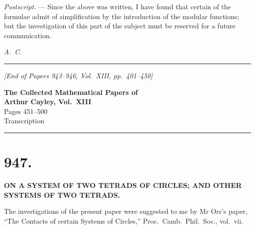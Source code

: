 \documentclass[11pt,a4paper]{book}
\begin{document}
\medskip

\noindent\textit{Postscript.} --- Since the above was written, I have found that certain of the formulae admit of simplification by the introduction of the modular functions; but the investigation of this part of the subject must be reserved for a future communication.

\vspace{1cm}
\begin{flushright}
\textit{A.~C.}
\end{flushright}

\vfill
\begin{center}
\rule{0.5\textwidth}{0.4pt}

\smallskip
\textit{[End of Papers 943--946, Vol.~XIII, pp.~401--450]}
\end{center}
\clearpage


\begin{center}
{\Large\bfseries The Collected Mathematical Papers of\\[0.5em] Arthur Cayley, Vol.~XIII}\\[1em]
{\large Pages 451--500}\\[0.5em]
{\normalsize Transcription}
\end{center}

\hrule
\vspace{1em}


\section*{947.}

\begin{center}
{\large\bfseries ON A SYSTEM OF TWO TETRADS OF CIRCLES; AND OTHER SYSTEMS OF TWO TETRADS.}
\end{center}

\begin{flushright}
\end{flushright}

The investigations of the present paper were suggested to me by Mr Orr's paper, ``The Contacts of certain Systems of Circles,'' Proc.~Camb.~Phil.~Soc., vol.~vii.
\end{document}
